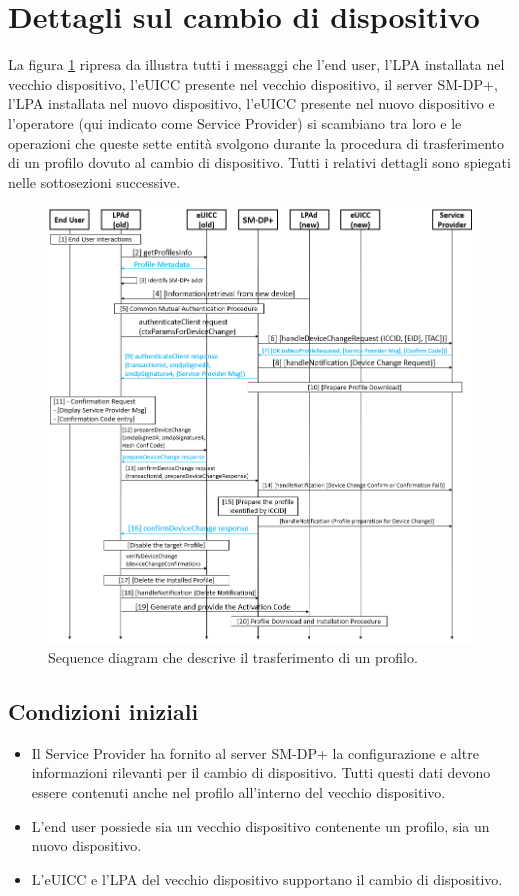 \documentclass[10pt, twoside, openany]{book}
\begin{document}
\section{Dettagli sul cambio di dispositivo}
La figura \ref{fig:device-change} ripresa da \cite{GSMA-docs-new} illustra tutti i messaggi che l'end user, l'LPA installata nel vecchio dispositivo, l'eUICC presente nel vecchio dispositivo, il server SM-DP+, l'LPA installata nel nuovo dispositivo, l'eUICC presente nel nuovo dispositivo e l'operatore (qui indicato come Service Provider) si scambiano tra loro e le operazioni che queste sette entità svolgono durante la procedura di trasferimento di un profilo dovuto al cambio di dispositivo. Tutti i relativi dettagli \cite{GSMA-docs-new} sono spiegati nelle sottosezioni successive.
\begin{figure}
\includegraphics[width=\linewidth]{device-change.png}
\caption{Sequence diagram che descrive il trasferimento di un profilo.}
\label{fig:device-change}
\end{figure}

\subsection{Condizioni iniziali}
\begin{itemize}
\item Il Service Provider ha fornito al server SM-DP+ la configurazione e altre informazioni rilevanti per il cambio di dispositivo. Tutti questi dati devono essere contenuti anche nel profilo all'interno del vecchio dispositivo.
\item L'end user possiede sia un vecchio dispositivo contenente un profilo, sia un nuovo dispositivo.
\item L'eUICC e l'LPA del vecchio dispositivo supportano il cambio di dispositivo.
\end{itemize}
\end{document}
